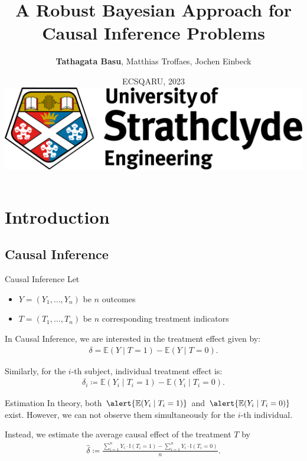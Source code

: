 \documentclass[aspectratio=169]{beamer}					%
\title[]{A Robust Bayesian Approach for Causal Inference Problems}%
\author[]{\textbf{Tathagata Basu}, Matthias Troffaes, Jochen Einbeck}								%
\date{ECSQARU, 2023\\

\vspace{2em}
\includegraphics[width = 0.3\linewidth]{strath_engineering.jpg}}
\begin{document}
\begin{frame}
  \titlepage
\end{frame}

\section{Introduction}

\subsection{Causal Inference}

\begin{frame}{Causal Inference}
Let
\begin{itemize}
    \item $Y=(Y_1, \dots, Y_n)$ be $n$ outcomes
    \item $T=(T_1, \dots, T_n)$ be $n$ corresponding treatment indicators
\end{itemize}

In \alert{Causal Inference}, we are interested in the
\alert{treatment effect} given by: 
\begin{align}
	\delta = \mathbb{E}(Y\mid T =1) - \mathbb{E}(Y\mid T=0).
\end{align}
\pause

Similarly, for the $i$-th subject, \alert{individual treatment effect} is:
\begin{align}
	\delta_i \coloneqq \mathbb{E}(Y_i\mid T_i=1) - \mathbb{E}(Y_i\mid T_i=0).
\end{align}

\end{frame}

\begin{frame}{Estimation}
In theory, both $\alert{\mathbb{E}(Y_i\mid T_i=1)}$ and 
$\alert{\mathbb{E}(Y_i\mid T_i=0)}$ exist.
However, we can not observe them simultaneously for the $i$-th individual. 

\vspace{2em}

Instead, we estimate the average causal effect of the treatment $T$ by 
\begin{align}
	\hat{\delta} \coloneqq 
	\frac{\sum_{i=1}^n Y_i\cdot\mathbb{I}(T_i=1) - 
		\sum_{i=1}^n Y_i\cdot\mathbb{I}(T_i=0)}{n}.
\end{align}
\end{frame}
\end{document}
